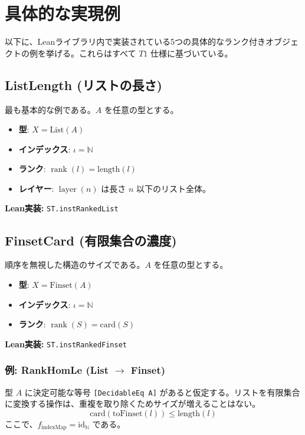 \documentclass[a4paper,11pt]{article}
\theoremstyle{definition}
\theoremstyle{plain}
\newcommand{\code}[1]{\texttt{#1}}
\newcommand{\rank}{\operatorname{rank}}
\newcommand{\layer}{\operatorname{layer}}
\newcommand{\indexMap}{\operatorname{indexMap}}
\newcommand{\N}{\mathbb{N}}
\newcommand{\List}{\mathrm{List}}
\newcommand{\Finset}{\mathrm{Finset}}
\begin{document}
\section{具体的な実現例}

以下に、Leanライブラリ内で実装されている5つの具体的なランク付きオブジェクトの例を挙げる。これらはすべて $T1$ 仕様に基づいている。

\subsection{ListLength (リストの長さ)}
最も基本的な例である。$A$ を任意の型とする。
\begin{itemize}
    \item \textbf{型}: $X = \List(A)$
    \item \textbf{インデックス}: $\iota = \N$
    \item \textbf{ランク}: $\rank(l) = \mathrm{length}(l)$
    \item \textbf{レイヤー}: $\layer(n)$ は長さ $n$ 以下のリスト全体。
\end{itemize}
\noindent \textbf{Lean実装:} \code{ST.instRankedList}

\subsection{FinsetCard (有限集合の濃度)}
順序を無視した構造のサイズである。$A$ を任意の型とする。
\begin{itemize}
    \item \textbf{型}: $X = \Finset(A)$
    \item \textbf{インデックス}: $\iota = \N$
    \item \textbf{ランク}: $\rank(S) = \mathrm{card}(S)$
\end{itemize}
\noindent \textbf{Lean実装:} \code{ST.instRankedFinset}

\subsubsection*{例: RankHomLe (List $\to$ Finset)}
型 $A$ に決定可能な等号 \code{[DecidableEq A]} があると仮定する。リストを有限集合に変換する操作は、重複を取り除くためサイズが増えることはない。
\[ \mathrm{card}(\mathrm{toFinset}(l)) \le \mathrm{length}(l) \]
ここで、$f_{\indexMap} = \mathrm{id}_{\N}$ である。
\end{document}
